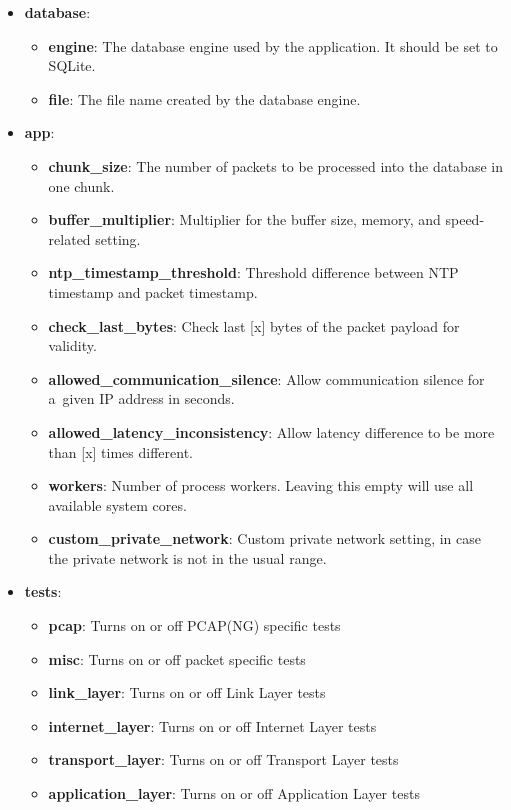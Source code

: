 \documentclass[
  printed,     %
  color,       %
  oneside,     %
  nosansbold,  %
  nocolorbold, %
  nolof,         %
  nolot,         %
]{fithesis4}
\begin{document}
\begin{itemize}[noitemsep,topsep=0pt]
    \item \textbf{database}:
        \begin{itemize}[noitemsep,topsep=0pt]
            \item \textbf{engine}: The database engine used by the application. It should be set to SQLite.
            \item \textbf{file}: The file name created by the database engine.
        \end{itemize}
    \item \textbf{app}: 
        \begin{itemize}[noitemsep,topsep=0pt]
            \item \textbf{chunk\_size}: The number of packets to be processed into the database in one chunk.
            \item \textbf{buffer\_multiplier}: Multiplier for the buffer size, memory, and speed-related setting.
            \item \textbf{ntp\_timestamp\_threshold}: Threshold difference between NTP timestamp and packet timestamp.
            \item \textbf{check\_last\_bytes}: Check last [x] bytes of the packet payload for validity.
            \item \textbf{allowed\_communication\_silence}: Allow communication silence for a~given IP address in seconds.
            \item \textbf{allowed\_latency\_inconsistency}: Allow latency difference to be more than [x] times different.
            \item \textbf{workers}: Number of process workers. Leaving this empty will use all available system cores.
            \item \textbf{custom\_private\_network}: Custom private network setting, in case the private network is not in the usual range.
        \end{itemize}
    \item \textbf{tests}:
        \begin{itemize}[noitemsep,topsep=0pt]
            \item \textbf{pcap}: Turns on or off PCAP(NG) specific tests
            \item \textbf{misc}: Turns on or off packet specific tests
            \item \textbf{link\_layer}: Turns on or off Link Layer tests
            \item \textbf{internet\_layer}: Turns on or off Internet Layer tests
            \item \textbf{transport\_layer}: Turns on or off Transport Layer tests
            \item \textbf{application\_layer}: Turns on or off Application Layer tests
        \end{itemize}
\end{itemize}
\end{document}
